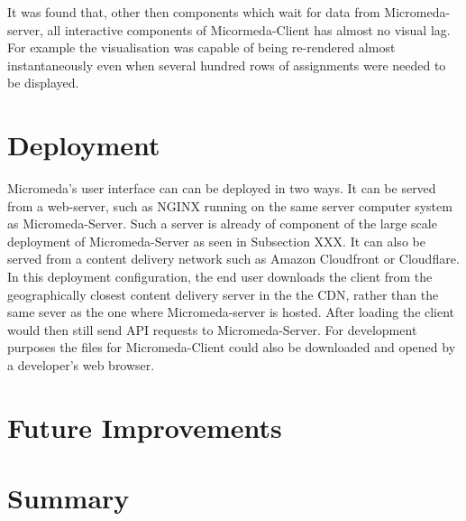 It was found that, other then components which wait for data from Micromeda-server, all interactive components of Micormeda-Client has almost no visual lag. For example the visualisation was capable of being re-rendered almost instantaneously even when several hundred rows of assignments were needed to be displayed.

\section{Deployment}

Micromeda's user interface can can be deployed in two ways. It can be served from a web-server, such as NGINX running on the same server computer system as Micromeda-Server. Such a server is already of component of the large scale deployment of Micromeda-Server as seen in Subsection XXX. It can also be served from a content delivery network such as Amazon Cloudfront or Cloudflare. In this deployment configuration, the end user downloads the client from the geographically closest content delivery server in the the CDN, rather than the same sever as the one where Micromeda-server is hosted. After loading the client would then still send API requests to Micromeda-Server. For development purposes the files for Micromeda-Client could also be downloaded and opened by a developer's web browser.

\section{Future Improvements} \label{client-improvements}

\section{Summary} 